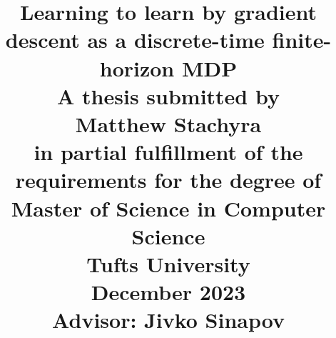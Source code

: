 \documentclass[12pt]{report}
\begin{document}
\title{
  {\Large \textbf{Learning to learn by gradient descent as a discrete-time finite-horizon MDP}}\\
  \vspace{2cm}
  {\normalsize A thesis submitted by}\\
  {\large Matthew Stachyra}\\
  {\normalsize in partial fulfillment of the requirements for the degree of}\\
  {\normalsize Master of Science in Computer Science}\\
  \vspace{2cm}
  {\normalsize Tufts University}\\
  {\normalsize December 2023}\\
  {\normalsize Advisor: Jivko Sinapov}
  \date{}
}
\maketitle
\tableofcontents \clearpage
{}








\cleardoublepage 
\printbibliography[title={Bibliography},heading=bibintoc]
\end{document}
